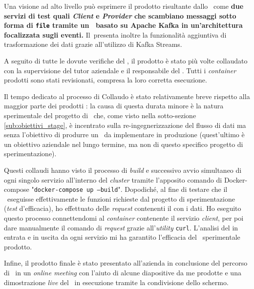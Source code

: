 Una visione ad alto livello può esprimere il prodotto risultante dallo \stage\ come \textbf{due servizi di test quali  \textit{Client} e  \textit{Provider} che scambiano messaggi sotto forma di \texttt{file}  tramite un \middleware\ basato su Apache Kafka in un'architettura focalizzata sugli eventi.}
Il\middleware\ presenta inoltre la funzionalità aggiuntiva di trasformazione dei dati grazie all'utilizzo di Kafka Streams.

A seguito di tutte le dovute verifiche del \software, il prodotto è stato più volte collaudato con la supervisione del tutor aziendale e il responsabile del .
Tutti i \textit{container} prodotti sono stati revisionati, compresa la loro corretta esecuzione.

Il tempo dedicato al processo di Collaudo è stato relativamente breve rispetto alla maggior parte dei prodotti \software: la causa di questa durata minore è la natura sperimentale del progetto di \stage\ che, come visto nella sotto-sezione \ref{sub:obiettivi_stage}, è incentrato sulla re-ingegnerizzazione del flusso di dati ma senza l'obiettivo di produrre un \middleware\ da implementare in produzione (quest'ultimo è un obiettivo aziendale nel lungo termine, ma non di questo specifico progetto di sperimentazione).

Questi collaudi hanno visto il processo di \textit{build} e successivo avvio simultaneo di ogni singolo servizio all'interno del \textit{cluster} tramite l'apposito comando di Docker-compose "\texttt{docker-compose up --build}".
Dopodiché, al fine di testare che il \software\ eseguisse effettivamente le funzioni richieste dal progetto di sperimentazione (\textit{test} d'efficacia), ho effettuato delle   \textit{request} contenenti il  con i dati.
Ho eseguito questo processo connettendomi al \textit{container} contenente il servizio  \textit{client}, per poi dare manualmente il comando di \textit{request} grazie all'\textit{utility} \texttt{curl}.
L'analisi del  in entrata e in uscita da ogni servizio mi ha garantito l'efficacia del \software\ sperimentale prodotto.

Infine, il prodotto finale è stato presentato all'azienda in conclusione del percorso di \stage\ in un \textit{online meeting} con l'aiuto di alcune diapositive da me prodotte e una dimostrazione \textit{live} del \software\ in esecuzione tramite la condivisione dello schermo.


